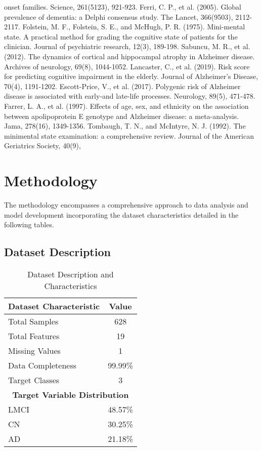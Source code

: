 \documentclass[conference]{IEEEtran}
\begin{document}
onset families. Science, 261(5123), 921-923. Ferri, C. P., et al. (2005). Global prevalence of dementia: a Delphi consensus study. The Lancet, 366(9503), 2112-2117. Folstein, M. F., Folstein, S. E., and McHugh, P. R. (1975). Mini-mental state. A practical method for grading the cognitive state of patients for the clinician. Journal of psychiatric research, 12(3), 189-198. Sabuncu, M. R., et al. (2012). The dynamics of cortical and hippocampal atrophy in Alzheimer disease. Archives of neurology, 69(8), 1044-1052. Lancaster, C., et al. (2019). Risk score for predicting cognitive impairment in the elderly. Journal of Alzheimer's Disease, 70(4), 1191-1202. Escott-Price, V., et al. (2017). Polygenic risk of Alzheimer disease is associated with early-and late-life processes. Neurology, 89(5), 471-478. Farrer, L. A., et al. (1997). Effects of age, sex, and ethnicity on the association between apolipoprotein E genotype and Alzheimer disease: a meta-analysis. Jama, 278(16), 1349-1356. Tombaugh, T. N., and McIntyre, N. J. (1992). The minimental state examination: a comprehensive review. Journal of the American Geriatrics Society, 40(9),

\section{Methodology}
The methodology encompasses a comprehensive approach to data analysis and model development incorporating the dataset characteristics detailed in the following tables.

\subsection{Dataset Description}

\begin{table}[!h]
\centering
\caption{Dataset Description and Characteristics}
\label{tab:dataset_description}
\begin{tabular}{|l|c|}
\hline
\textbf{Dataset Characteristic} & \textbf{Value} \\
\hline
Total Samples & 628 \\
\hline
Total Features & 19 \\
\hline
Missing Values & 1 \\
\hline
Data Completeness & 99.99\% \\
\hline
Target Classes & 3 \\
\hline
\hline
\multicolumn{2}{|c|}{\textbf{Target Variable Distribution}} \\
\hline
LMCI & 48.57\% \\
\hline
CN & 30.25\% \\
\hline
AD & 21.18\% \\
\hline
\end{tabular}
\end{table}
\end{document}
